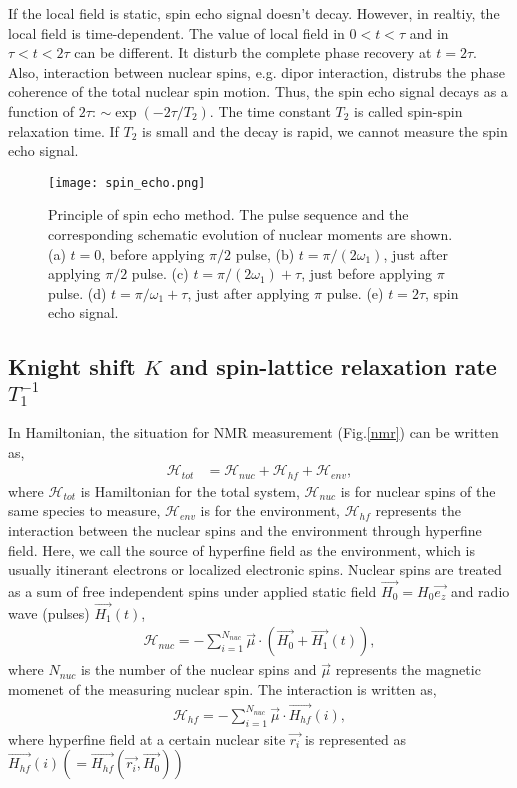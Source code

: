 \documentclass[a4,10.5pt]{report}
\begin{document}
If the local field is static, spin echo signal doesn't decay.
However, in realtiy, the local field is time-dependent.
The value of local field in $0 < t < \tau$ and in $\tau < t < 2\tau$ can be different.
It disturb the complete phase recovery at $t = 2\tau$. 
Also, interaction between nuclear spins, e.g. dipor interaction, distrubs the phase coherence of the total nuclear spin motion.
Thus, the spin echo signal decays as a function of $2\tau$: $\sim \exp(-2\tau/T_2)$.
The time constant $T_2$ is called spin-spin relaxation time.
If $T_2$ is small and the decay is rapid, we cannot measure the spin echo signal.

\begin{figure}
  \centering
  \texttt{[image: spin\_echo.png]}
  \caption{Principle of spin echo method.
  The pulse sequence and the corresponding schematic evolution of nuclear moments are shown.
  (a) $t = 0$, before applying $\pi/2$ pulse, (b) $t = \pi/(2\omega_1)$, just after applying $\pi/2$ pulse.
  (c) $t = \pi/(2\omega_1) + \tau$, just before applying $\pi$ pulse.
  (d) $t = \pi/\omega_1 + \tau$, just after applying $\pi$ pulse.
  (e) $t = 2\tau$, spin echo signal.}
  \label{spin_echo}
\end{figure}

\subsection{Knight shift $K$ and spin-lattice relaxation rate $T^{-1}_1$}
In Hamiltonian, the situation for NMR measurement (Fig.\ref{nmr}) can be written as,
\begin{align}
\mathcal{H}_{tot} &=\mathcal{H}_{nuc} + \mathcal{H}_{hf}+\mathcal{H}_{env},
\end{align}
where $\mathcal{H}_{tot}$ is Hamiltonian for the total system, 
$\mathcal{H}_{nuc}$ is for nuclear spins of the same species to measure, $\mathcal{H}_{env}$ is for the environment, 
$\mathcal{H}_{hf}$ represents the interaction between the nuclear spins and the environment through hyperfine field.
Here, we call the source of hyperfine field as the environment, which is usually itinerant electrons or localized electronic spins. 
Nuclear spins are treated as a sum of free independent spins under applied static field $\overrightarrow{H_0} = H_0\overrightarrow{e_z}$ 
and radio wave (pulses) $\overrightarrow{H_1}(t)$,
\begin{align}
\mathcal{H}_{nuc} = -\sum^{N_{nuc}}_{i = 1}\vec{\mu}\cdot\left(\overrightarrow{H_0}+\overrightarrow{H_1}(t)\right),
\end{align}
where $N_{nuc}$ is the number of the nuclear spins and $\vec{\mu}$ represents the magnetic momenet of the measuring nuclear spin. 
The interaction is written as,
\begin{align}
\mathcal{H}_{hf} = -\sum^{N_{nuc}}_{i = 1}\vec{\mu}\cdot\overrightarrow{H_{hf}}(i),
\end{align}
where hyperfine field at a certain nuclear site $\overrightarrow{r_i}$ is represented as 
$\overrightarrow{H_{hf}}(i) \left(= \overrightarrow{H_{hf}}\left(\overrightarrow{r_i}, \overrightarrow{H_0}\right) \right)$
\end{document}
